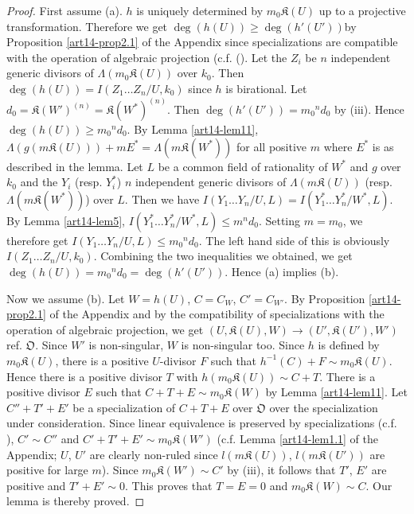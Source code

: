 \begin{proof}
First assume (a). $h$ is uniquely determined by $m_{0}\mathfrak{K}(U)$ up to a projective transformation. Therefore we get $\deg(h(U))\geq \deg (h'(U'))$\pageoriginale by Proposition \ref{art14-prop2.1} of the Appendix since specializations are compatible with the operation of algebraic projection (c.f. (\cite{art14-key24}). Let the $Z_{i}$ be $n$ independent generic divisors of $\Lambda(m_{0}\mathfrak{K}(U))$ over $k_{0}$. Then $\deg(h(U))=I(Z_{1}\ldots Z_{n}/U,k_{0})$ since $h$ is birational. Let $d_{0}=\mathfrak{K}(W')^{(n)}=\mathfrak{K}(W^{*})^{(n)}$. Then $\deg(h'(U'))=m_{0}{}^{n}d_{0}$ by (iii). Hence $\deg (h(U))\geq m_{0}{}^{n}d_{0}$. By Lemma \ref{art14-lem11}, $\Lambda (g(m\mathfrak{K}(U)))+mE^{*}=\Lambda(m\mathfrak{K}(W^{*}))$ for all positive $m$ where $E^{*}$ is as described in the lemma. Let $L$ be a common field of rationality of $W^{*}$ and $g$ over $k_{0}$ and the $Y_{i}$ (resp. $Y^{*}_{i}$) $n$ independent generic divisors of $\Lambda(m\mathfrak{K}(U))$ (resp. $\Lambda(m\mathfrak{K}(W^{*}))$) over $L$. Then we have $I(Y_{1}\ldots Y_{n}/U,L)=I(Y^{*}_{1}\ldots Y^{*}_{n}/W^{*},L)$. By Lemma \ref{art14-lem5}, $I(Y^{*}_{1}\ldots Y^{*}_{n}/W^{*},L)\leq m^{n}d_{0}$. Setting $m=m_{0}$, we therefore get $I(Y_{1}\ldots Y_{n}/U,L)\leq m_{0}{}^{n}d_{0}$. The left hand side of this is obviously $I(Z_{1}\ldots Z_{n}/U,k_{0})$. Combining the two inequalities we obtained, we get $\deg(h(U))=m_{0}{}^{n}d_{0}=\deg(h'(U'))$. Hence (a) implies (b).

Now we assume (b). Let $W=h(U)$, $C=C_{W}$, $C'=C_{W'}$. By Proposition \ref{art14-prop2.1} of the Appendix and by the compatibility of specializations with the operation of algebraic projection, we get $(U,\mathfrak{K}(U), W)\to (U',\mathfrak{K}(U'),W')$ ref. $\mathfrak{O}$. Since $W'$ is non-singular, $W$ is non-singular too. Since $h$ is defined by $m_{0}\mathfrak{K}(U)$, there is a positive $U$-divisor $F$ such that $h^{-1}(C)+F\sim m_{0}\mathfrak{K}(U)$. Hence there is a positive divisor $T$ with $h(m_{0}\mathfrak{K}(U))\sim C+T$. There is a positive divisor $E$ such that $C+T+E\sim m_{0}\mathfrak{K}(W)$ by Lemma \ref{art14-lem11}. Let $C''+T'+E'$ be a specialization of $C+T+E$ over $\mathfrak{O}$ over the specialization under consideration. Since linear equivalence is preserved by specializations (c.f. \cite{art14-key24}), $C'\sim C''$ and $C'+T'+E'\sim m_{0}\mathfrak{K}(W')$ (c.f. Lemma \ref{art14-lem1.1} of the Appendix; $U$, $U'$ are clearly non-ruled since $l(m\mathfrak{K}(U))$, $l(m\mathfrak{K}(U'))$ are positive for large $m$). Since $m_{0}\mathfrak{K}(W')\sim C'$ by (iii), it follows that $T'$, $E'$ are positive and $T'+E'\sim 0$. This proves that $T=E=0$ and $m_{0}\mathfrak{K}(W)\sim C$. Our lemma is thereby proved.
\end{proof}

